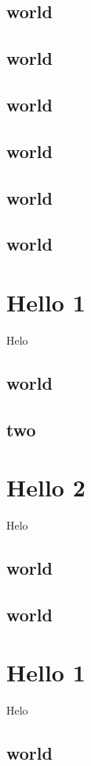 \documentclass[10pt]{book}
\begin{document}
\section{world }

\section{world }
\section{world }
\section{world }
\section{world }
\section{world }

\chapter{Hello 1}
Helo
\section{world }
\section{two}

\chapter{Hello 2}
Helo
\section{world }
\section{world }\chapter{Hello 1}
Helo
\section{world }
\end{document}
